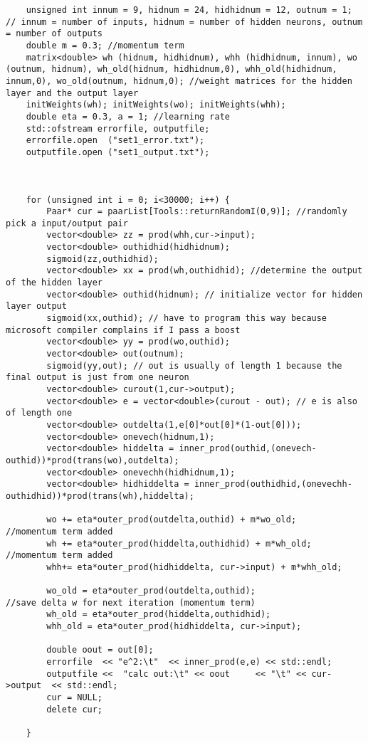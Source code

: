 \documentclass[10pt]{article}
\begin{document}
\begin{lstlisting}
	unsigned int innum = 9, hidnum = 24, hidhidnum = 12, outnum = 1; // innum = number of inputs, hidnum = number of hidden neurons, outnum = number of outputs
	double m = 0.3; //momentum term
	matrix<double> wh (hidnum, hidhidnum), whh (hidhidnum, innum), wo (outnum, hidnum), wh_old(hidnum, hidhidnum,0), whh_old(hidhidnum, innum,0), wo_old(outnum, hidnum,0); //weight matrices for the hidden layer and the output layer
	initWeights(wh); initWeights(wo); initWeights(whh);
	double eta = 0.3, a = 1; //learning rate
	std::ofstream errorfile, outputfile;
	errorfile.open  ("set1_error.txt");
	outputfile.open ("set1_output.txt");
	
	

	for (unsigned int i = 0; i<30000; i++) {
		Paar* cur = paarList[Tools::returnRandomI(0,9)]; //randomly pick a input/output pair
		vector<double> zz = prod(whh,cur->input);
		vector<double> outhidhid(hidhidnum);
		sigmoid(zz,outhidhid);
		vector<double> xx = prod(wh,outhidhid); //determine the output of the hidden layer
		vector<double> outhid(hidnum); // initialize vector for hidden layer output
		sigmoid(xx,outhid); // have to program this way because microsoft compiler complains if I pass a boost
		vector<double> yy = prod(wo,outhid);
		vector<double> out(outnum);
		sigmoid(yy,out); // out is usually of length 1 because the final output is just from one neuron
		vector<double> curout(1,cur->output);
		vector<double> e = vector<double>(curout - out); // e is also of length one
		vector<double> outdelta(1,e[0]*out[0]*(1-out[0]));
		vector<double> onevech(hidnum,1);
		vector<double> hiddelta = inner_prod(outhid,(onevech-outhid))*prod(trans(wo),outdelta);
		vector<double> onevechh(hidhidnum,1);
		vector<double> hidhiddelta = inner_prod(outhidhid,(onevechh-outhidhid))*prod(trans(wh),hiddelta);

		wo += eta*outer_prod(outdelta,outhid) + m*wo_old;       //momentum term added
		wh += eta*outer_prod(hiddelta,outhidhid) + m*wh_old;   //momentum term added
		whh+= eta*outer_prod(hidhiddelta, cur->input) + m*whh_old;

		wo_old = eta*outer_prod(outdelta,outhid);                   //save delta w for next iteration (momentum term)
		wh_old = eta*outer_prod(hiddelta,outhidhid);
		whh_old = eta*outer_prod(hidhiddelta, cur->input);
		
		double oout = out[0];
		errorfile  << "e^2:\t"  << inner_prod(e,e) << std::endl;
		outputfile <<  "calc out:\t" << oout     << "\t" << cur->output  << std::endl;
		cur = NULL;
		delete cur;

	}


\end{lstlisting}
\end{document}
